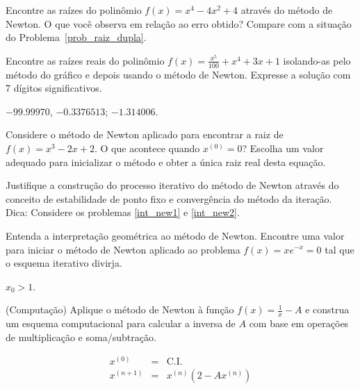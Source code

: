 \begin{ex}
\begin{exer}\label{new3} Encontre as raízes do polinômio $f(x)=x^4-4x^2+4$ através do método de Newton. O que você observa em relação ao erro obtido? Compare com a situação do Problema~\ref{prob_raiz_dupla}.
\end{exer}

\begin{exer}\label{new4} Encontre as raízes reais do polinômio $f(x)=\frac{x^5}{100}+x^4+3x+1$ isolando-as pelo método do gráfico e depois usando o método de Newton. Expresse a solução com 7 dígitos significativos.
\end{exer}
\begin{resp}
 $-99.99970$, $-0.3376513$; $-1.314006$.
 \end{resp}

\begin{exer}Considere o método de Newton aplicado para encontrar a raiz de $f(x)=x^3-2x+2$. O que acontece quando $x^{(0)}=0$? Escolha um valor adequado para inicializar o método e obter a única raiz real desta equação.
\end{exer}

\begin{exer} Justifique a construção do processo iterativo do método de Newton através do conceito de estabilidade de ponto fixo e convergência do método da iteração. Dica: Considere os problemas \ref{int_new1} e \ref{int_new2}.
\end{exer}

\begin{exer} Entenda a interpretação geométrica ao método de Newton. Encontre uma valor para iniciar o método de Newton aplicado ao problema $f(x)=xe^{-x}=0$ tal que o esquema iterativo divirja.
\end{exer}
\begin{resp}

$x_0>1$.

\end{resp}

\begin{exer}(Computação) Aplique o método de Newton à função $f(x)=\frac{1}{x}-A$ e construa um esquema computacional para calcular a inversa de $A$ com base em operações de multiplicação e soma/subtração.
 \end{exer}
\begin{resp}
  \begin{eqnarray}
 x^{(0)} &=& \text{C.I.}\\
 x^{(n+1)}&=&x^{(n)}\left(2-Ax^{(n)}\right) \\
 \end{eqnarray}
\end{resp}



\end{ex}
